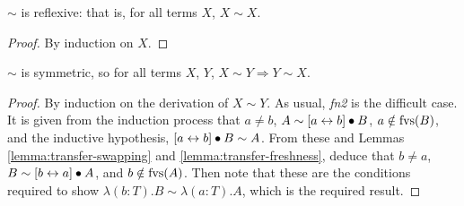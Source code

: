 \begin{lemma}
\(\sim\) is reflexive: that is, for all terms \(X\), \(X \sim X\).
\end{lemma}
\begin{proof}
By induction on \(X\).
\end{proof}

\begin{lemma}
\(\sim\) is symmetric, so for all terms \(X\), \(Y\), \(X \sim Y \Longrightarrow Y \sim X\).
\end{lemma}
\begin{proof}
By induction on the derivation of \(X \sim Y\).
As usual, \emph{fn2} is the difficult case.
It is given from the induction process that \(a \neq b\), \(A \sim [a \leftrightarrow b] \bullet B\), \(a \notin \mathrm{fvs}(B)\), and the inductive hypothesis, \([a \leftrightarrow b] \bullet B \sim A\).
From these and Lemmas \ref{lemma:transfer-swapping} and \ref{lemma:transfer-freshness}, deduce that \(b \neq a\), \(B \sim [b \leftrightarrow a] \bullet A\), and \(b \notin \mathrm{fvs}(A)\).
Then note that these are the conditions required to show \(\lambda (b:T).B \sim \lambda (a:T).A\), which is the required result.
\end{proof}

